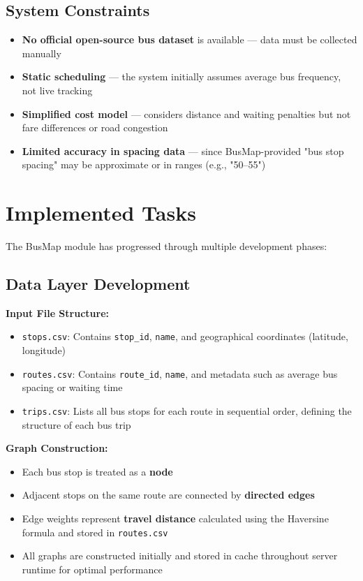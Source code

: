\subsection{System Constraints}

\begin{itemize}
    \item \textbf{No official open-source bus dataset} is available — data must be collected manually
    \item \textbf{Static scheduling} — the system initially assumes average bus frequency, not live tracking
    \item \textbf{Simplified cost model} — considers distance and waiting penalties but not fare differences or road congestion
    \item \textbf{Limited accuracy in spacing data} — since BusMap-provided "bus stop spacing" may be approximate or in ranges (e.g., "50–55")
\end{itemize}

\section{Implemented Tasks}

The BusMap module has progressed through multiple development phases:

\subsection{Data Layer Development}

\textbf{Input File Structure:}
\begin{itemize}
    \item \texttt{stops.csv}: Contains \texttt{stop\_id}, \texttt{name}, and geographical coordinates (latitude, longitude)
    \item \texttt{routes.csv}: Contains \texttt{route\_id}, \texttt{name}, and metadata such as average bus spacing or waiting time
    \item \texttt{trips.csv}: Lists all bus stops for each route in sequential order, defining the structure of each bus trip
\end{itemize}

\textbf{Graph Construction:}
\begin{itemize}
    \item Each bus stop is treated as a \textbf{node}
    \item Adjacent stops on the same route are connected by \textbf{directed edges}
    \item Edge weights represent \textbf{travel distance} calculated using the Haversine formula and stored in \texttt{routes.csv}
    \item All graphs are constructed initially and stored in cache throughout server runtime for optimal performance
\end{itemize}

